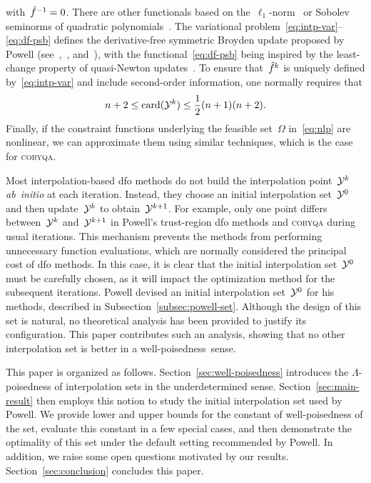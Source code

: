 \documentclass{article}
\numberwithin{equation}{section}
\theoremstyle{definition}
\theoremstyle{plain}
\theoremstyle{remark}
\DeclareMathOperator{\card}{card}
\newcommand*{\fset}{\Omega}
\newcommand*{\obj}{f}
\newcommand*{\objm}[1][]{\hat{\obj}\ifblank{#1}{}{^{#1}}}
\newcommand*{\solvername}[1]{\textsc{#1}\xspace}
\newcommand*{\xpt}[1][]{\mathcal{Y}\ifblank{#1}{}{^{#1}}}
\begin{document}
with~$\objm[-1] = 0$.
There are other functionals based on the~$\ell_1$-norm~\cite{Bandeira_Scheinberg_Vicente_2012} or Sobolev seminorms of quadratic polynomials~\cite{Zhang_2014,Xie_Yuan_2022}.
The variational problem~\eqref{eq:intp-var}--\eqref{eq:df-psb} defines the derivative-free symmetric
Broyden update proposed by Powell (see~\cite{Powell_2004a,Powell_2013},~\cite[\S~3.6]{Zhang_2012},
and~\cite[\S~2.4.2]{Ragonneau_2022}),
with the functional~\eqref{eq:df-psb} being inspired by the least-change property of quasi-Newton updates~\cite{Dennis_Schnabel_1979}.
To ensure that~$\objm[k]$ is uniquely defined by~\eqref{eq:intp-var} and include second-order information, one normally requires that
\begin{equation*}
    n + 2 \le \card(\xpt[k]) \le \frac{1}{2} (n + 1) (n + 2).
\end{equation*}
Finally, if the constraint functions underlying the feasible set~$\fset$ in~\eqref{eq:nlp} are nonlinear, we can approximate them using similar techniques, which is the case for \solvername{cobyqa}.

Most interpolation-based \gls{dfo} methods do not build the interpolation point~$\xpt[k]$ \emph{ab~initio} at each iteration.
Instead, they choose an initial interpolation set~$\xpt[0]$ and then  update~$\xpt[k]$ to obtain~$\xpt[k + 1]$.
For example, only one point differs between~$\xpt[k]$ and~$\xpt[k + 1]$ in Powell's trust-region \gls{dfo} methods and \solvername{cobyqa} during usual iterations.
This mechanism prevents the methods from performing unnecessary function evaluations, which are normally considered the principal cost of \gls{dfo} methods.
In this case, it is clear that the initial interpolation set~$\xpt[0]$ must be carefully chosen, as it will impact the optimization method for the subsequent iterations.
Powell devised an initial interpolation set~$\xpt[0]$ for his methods, described in Subsection~\ref{subsec:powell-set}.
Although the design of this set is natural, no theoretical analysis has been provided to justify its configuration.
This paper contributes such an analysis, showing that no other interpolation set is better in
a well-poisedness~sense.

This paper is organized as follows.
Section~\ref{sec:well-poisedness} introduces the $\Lambda$-poisedness of interpolation sets in the underdetermined sense.
Section~\ref{sec:main-result} then employs this notion to study the initial interpolation set used by Powell.
We provide lower and upper bounds for the constant of well-poisedness of the set,
evaluate this constant in a few special cases,
and then demonstrate the optimality of this set under the default setting recommended by Powell.
In addition, we raise some open questions motivated by our results.
Section~\ref{sec:conclusion} concludes this paper.
\end{document}
